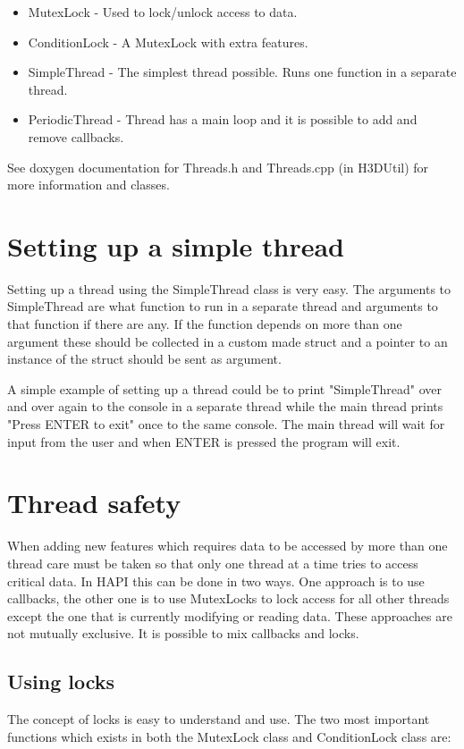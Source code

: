 \begin{itemize}
\item MutexLock - Used to lock/unlock access to data.
\item ConditionLock - A MutexLock with extra features.
\item SimpleThread - The simplest thread possible. Runs one function in a
separate thread.
\item PeriodicThread - Thread has a main loop and it is possible to add and
remove callbacks.
\end{itemize}

See doxygen documentation for Threads.h and Threads.cpp (in H3DUtil) for more
information and classes.

\section{Setting up a simple thread}
\label{secSimpleThread}
Setting up a thread using the SimpleThread class is very easy.
The arguments to SimpleThread are what function to run in a
separate thread and arguments to that function if there are any. If the
function depends on more than one argument these should be collected in a
custom made struct and a pointer to an instance of the struct should be sent
as argument.

A simple example of setting up a thread could be to print "SimpleThread"
over and over again to the console in a separate thread while the main thread
prints "Press ENTER to exit" once to the same console. The main thread will
wait for input from the user and when ENTER is pressed the program will exit.



\section{Thread safety}
When adding new features which requires data to
be accessed by more than one thread care must be taken so that only one thread
at a time tries to access critical data. In HAPI this can be done in two ways.
One approach is to use callbacks, the other one is to use MutexLocks to lock
access for all other threads except the one that is currently modifying or
reading data. These approaches are not mutually exclusive. It is possible to
mix callbacks and locks.

\subsection{Using locks}
The concept of locks is easy to understand and use. The two most important
functions which exists in both the MutexLock class and ConditionLock class are:

